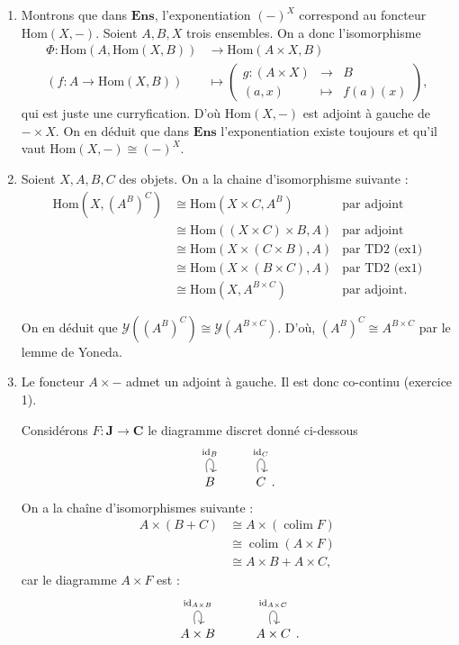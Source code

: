 \documentclass{../../td}
\begin{document}
  \begin{enumerate}
    \item Montrons que dans $\mathbf{Ens}$, l'exponentiation $(-)^X$ correspond au foncteur $\mathrm{Hom}(X, -)$.
      Soient $A,B,X$ trois ensembles.
      On a donc l'isomorphisme
      \begin{align*}
        \Phi: \mathrm{Hom}(A, \mathrm{Hom}(X, B)) &\longrightarrow \mathrm{Hom}(A \times X, B) \\
        (f : A \to \mathrm{Hom}(X, B)) &\longmapsto \left(
        \begin{array}{rcl}
          g : (A \times X) & \to & B\\
          (a,x) &\mapsto & f(a)(x)
        \end{array}
        \right)
      ,\end{align*}
      qui est juste une curryfication.
      D'où $\mathrm{Hom}(X, -)$ est adjoint à gauche de $- \times X$.
      On en déduit que dans $\mathbf{Ens}$ l'exponentiation existe toujours et qu'il vaut $\mathrm{Hom}(X, -) \cong (-)^X$.
    \item Soient $X,A,B,C$ des objets.
      On a la chaine d'isomorphisme suivante :
      \begin{align*}
        \mathrm{Hom}(X, (A^B)^C) &\cong \mathrm{Hom}(X \times C, A^B) & \text{par adjoint}\\
        &\cong \mathrm{Hom}((X \times C) \times B, A) & \text{par adjoint}\\
        &\cong \mathrm{Hom}(X \times (C \times B), A) & \text{par TD2 (ex1)}\\
        &\cong \mathrm{Hom}(X \times (B \times C), A) & \text{par TD2 (ex1)}\\
        &\cong \mathrm{Hom}(X, A^{B \times C}) & \text{par adjoint}
      .\end{align*}

      On en déduit que $\mathcal{Y}((A^{B})^{C}) \cong \mathcal{Y}(A^{B \times C})$.
      D'où, $(A^B)^C \cong A^{B \times C}$ par le lemme de Yoneda.
    \item Le foncteur $A \times -$ admet un adjoint à gauche.
      Il est donc co-continu (exercice 1).

      Considérons $F : \mathbf{J} \to \mathbf{C}$ le diagramme discret  donné ci-dessous \[
      \begin{tikzcd}
        B\arrow[loop above]{}{\mathrm{id}_B} & 
        C\arrow[loop above]{}{\mathrm{id}_C}
      \end{tikzcd}
      .\]
      On a la chaîne d'isomorphismes suivante :
      \begin{align*}
        A \times (B + C) &\cong A \times (\operatorname{colim} F)\\
        &\cong \operatorname{colim} (A \times F)\\
        &\cong A \times B + A \times C
      ,\end{align*}
      car le diagramme $A \times F$ est :\[
      \begin{tikzcd}
        A \times B\arrow[loop above]{}{\mathrm{id}_{A \times B}} & 
        A \times C\arrow[loop above]{}{\mathrm{id}_{A \times C}}
      \end{tikzcd}
      .\]
  \end{enumerate}
\end{document}
